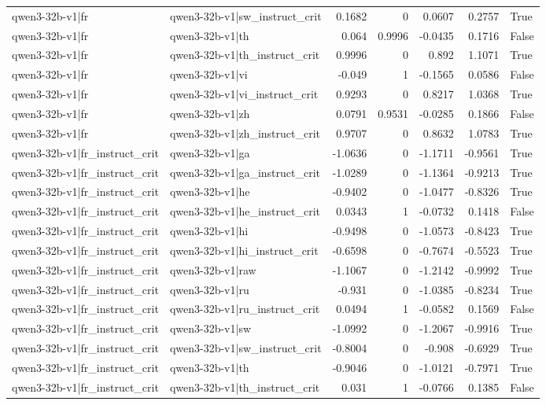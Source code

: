 \begin{table}
\begin{tabular}{l l r r r r l}
qwen3-32b-v1|fr & qwen3-32b-v1|sw_instruct_crit & 0.1682 & 0 & 0.0607 & 0.2757 & True \\
qwen3-32b-v1|fr & qwen3-32b-v1|th & 0.064 & 0.9996 & -0.0435 & 0.1716 & False \\
qwen3-32b-v1|fr & qwen3-32b-v1|th_instruct_crit & 0.9996 & 0 & 0.892 & 1.1071 & True \\
qwen3-32b-v1|fr & qwen3-32b-v1|vi & -0.049 & 1 & -0.1565 & 0.0586 & False \\
qwen3-32b-v1|fr & qwen3-32b-v1|vi_instruct_crit & 0.9293 & 0 & 0.8217 & 1.0368 & True \\
qwen3-32b-v1|fr & qwen3-32b-v1|zh & 0.0791 & 0.9531 & -0.0285 & 0.1866 & False \\
qwen3-32b-v1|fr & qwen3-32b-v1|zh_instruct_crit & 0.9707 & 0 & 0.8632 & 1.0783 & True \\
qwen3-32b-v1|fr_instruct_crit & qwen3-32b-v1|ga & -1.0636 & 0 & -1.1711 & -0.9561 & True \\
qwen3-32b-v1|fr_instruct_crit & qwen3-32b-v1|ga_instruct_crit & -1.0289 & 0 & -1.1364 & -0.9213 & True \\
qwen3-32b-v1|fr_instruct_crit & qwen3-32b-v1|he & -0.9402 & 0 & -1.0477 & -0.8326 & True \\
qwen3-32b-v1|fr_instruct_crit & qwen3-32b-v1|he_instruct_crit & 0.0343 & 1 & -0.0732 & 0.1418 & False \\
qwen3-32b-v1|fr_instruct_crit & qwen3-32b-v1|hi & -0.9498 & 0 & -1.0573 & -0.8423 & True \\
qwen3-32b-v1|fr_instruct_crit & qwen3-32b-v1|hi_instruct_crit & -0.6598 & 0 & -0.7674 & -0.5523 & True \\
qwen3-32b-v1|fr_instruct_crit & qwen3-32b-v1|raw & -1.1067 & 0 & -1.2142 & -0.9992 & True \\
qwen3-32b-v1|fr_instruct_crit & qwen3-32b-v1|ru & -0.931 & 0 & -1.0385 & -0.8234 & True \\
qwen3-32b-v1|fr_instruct_crit & qwen3-32b-v1|ru_instruct_crit & 0.0494 & 1 & -0.0582 & 0.1569 & False \\
qwen3-32b-v1|fr_instruct_crit & qwen3-32b-v1|sw & -1.0992 & 0 & -1.2067 & -0.9916 & True \\
qwen3-32b-v1|fr_instruct_crit & qwen3-32b-v1|sw_instruct_crit & -0.8004 & 0 & -0.908 & -0.6929 & True \\
qwen3-32b-v1|fr_instruct_crit & qwen3-32b-v1|th & -0.9046 & 0 & -1.0121 & -0.7971 & True \\
qwen3-32b-v1|fr_instruct_crit & qwen3-32b-v1|th_instruct_crit & 0.031 & 1 & -0.0766 & 0.1385 & False \\

\end{tabular}
\end{table}
